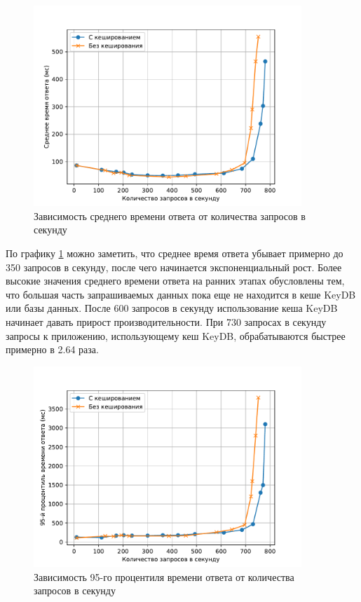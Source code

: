 \begin{figure}[H]
	\centering
	\includegraphics[width=0.9\textwidth]{img/avg-resp-time.pdf}
	\caption{Зависимость среднего времени ответа от количества запросов в секунду}
	\label{plot:avg}
\end{figure}

По графику \ref{plot:avg} можно заметить, что среднее время ответа убывает примерно до 350 запросов в секунду, после чего начинается экспоненциальный рост.
Более высокие значения среднего времени ответа на ранних этапах обусловлены тем, что большая часть запрашиваемых данных пока еще не находится в кеше KeyDB или базы данных.
После 600 запросов в секунду использование кеша KeyDB начинает давать прирост производительности.
При 730 запросах в секунду запросы к приложению, использующему кеш KeyDB, обрабатываются быстрее примерно в 2.64 раза.


\begin{figure}[H]
	\centering
	\includegraphics[width=0.9\textwidth]{img/95-resp-time.pdf}
	\caption{Зависимость 95-го процентиля времени ответа от количества запросов в секунду}
	\label{plot:95}
\end{figure}

